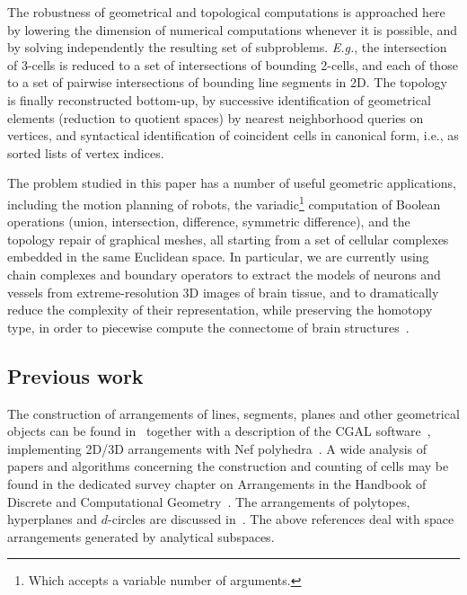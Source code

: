 The robustness of geometrical and topological computations is approached here by lowering the dimension of numerical computations whenever it is possible, and by solving independently the resulting set of subproblems.
{\emph{E.g.}}, the intersection of 3-cells is reduced to a set of intersections of {bounding} 2-cells, and each of those to {a set of pairwise intersections of} {bounding} line segments in 2D. The topology is finally reconstructed bottom-up, by successive identification of geometrical elements (reduction to quotient spaces) by nearest neighborhood queries on vertices, and syntactical identification of coincident cells in canonical form, i.e., as sorted lists of vertex indices.

The problem studied in this paper has a number of useful geometric applications, including the motion planning of robots, the
{variadic}\footnote{Which accepts a variable number of arguments.}
computation of Bool\-ean operations (union, intersection, difference,
symmetric difference), and the topology repair of graphical meshes, all starting from a set of cellular complexes embedded in the same Euclidean space. In particular, we are currently using chain complexes and boundary operators to extract the models of neurons and vessels from extreme-resolution 3D images of brain tissue, and to dramatically reduce the complexity of their representation, while preserving the homotopy type, in order to piecewise compute the connectome of brain structures~\cite{ClementiSSPP-CAD16,doi:10.1080/16864360.2016.1168216}.


\subsection{Previous work}

The construction of arrangements of lines, segments, planes and other geometrical objects can be found in~\cite{fhktww-a-07} together with a description of the CGAL software~\cite{Fabri:2000:DCC:358668.358687}, implementing 2D/3D arrangements with Nef polyhedra~\cite{Hachenberger:2007:BOS:1247750.1248141}. A wide analysis of papers and algorithms concerning the construction and counting of cells may be found in the dedicated survey chapter on Arrangements in the Handbook of Discrete and Computational Geometry~\cite{Goodman:2017:HDC:285869}. 
The arrangements of polytopes, hyperplanes and $d$-circles are discussed in~\cite{Ziegler:92}. 
The above references deal with space arrangements generated by analytical subspaces.

